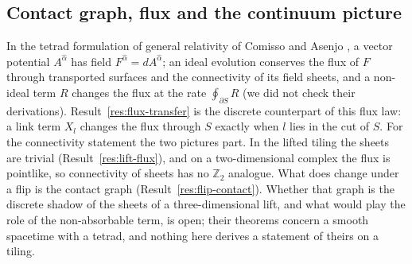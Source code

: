 \documentclass[11pt]{article}
\theoremstyle{definition}
\begin{document}
\subsection{Contact graph, flux and the continuum picture}\label{sec:reconnect}
In the tetrad formulation of general relativity of Comisso and Asenjo \cite{comisso2026}, a vector potential $A^{\hat\alpha}$ has field $F^{\hat\alpha}=dA^{\hat\alpha}$; an ideal evolution conserves the flux of $F$ through transported surfaces and the connectivity of its field sheets, and a non-ideal term $R$ changes the flux at the rate $\oint_{\partial S}R$ (we did not check their derivations). Result~\ref{res:flux-transfer} is the discrete counterpart of this flux law: a link term $X_l$ changes the flux through $S$ exactly when $l$ lies in the cut of $S$. For the connectivity statement the two pictures part. In the lifted tiling the sheets are trivial (Result~\ref{res:lift-flux}), and on a two-dimensional complex the flux is pointlike, so connectivity of sheets has no $\mathbb{Z}_2$ analogue. What does change under a flip is the contact graph (Result~\ref{res:flip-contact}). Whether that graph is the discrete shadow of the sheets of a three-dimensional lift, and what would play the role of the non-absorbable term, is open; their theorems concern a smooth spacetime with a tetrad, and nothing here derives a statement of theirs on a tiling.

\end{document}
